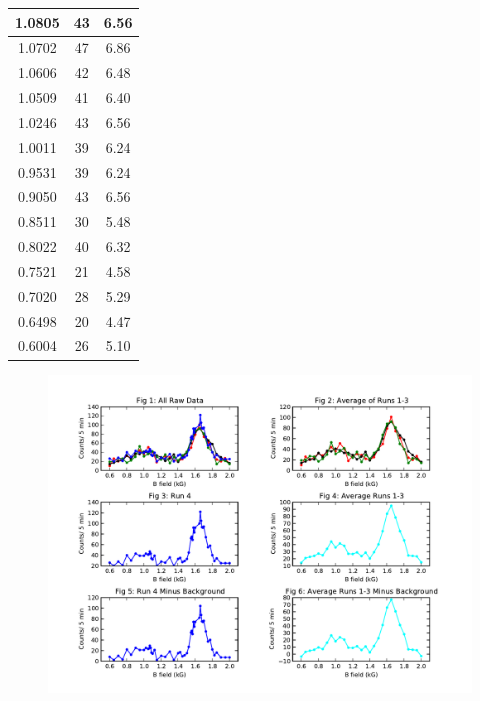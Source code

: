 \begin{table}
\begin{tabular}{|c|c|c|}
1.0805	&	43	&	6.56	\\ \hline
1.0702	&	47	&	6.86	\\ \hline
1.0606	&	42	&	6.48	\\ \hline
1.0509	&	41	&	6.40	\\ \hline
1.0246	&	43	&	6.56	\\ \hline
1.0011	&	39	&	6.24	\\ \hline
0.9531	&	39	&	6.24	\\ \hline
0.9050	&	43	&	6.56	\\ \hline
0.8511	&	30	&	5.48	\\ \hline
0.8022	&	40	&	6.32	\\ \hline
0.7521	&	21	&	4.58	\\ \hline
0.7020	&	28	&	5.29	\\ \hline
0.6498	&	20	&	4.47	\\ \hline
0.6004	&	26	&	5.10	\\ \hline
\end{tabular}
\end{table}
\begin{figure}[h!]
\begin{center}
\includegraphics[width=7.5in]{field_counts.pdf}
\end{center}
\end{figure}



  
